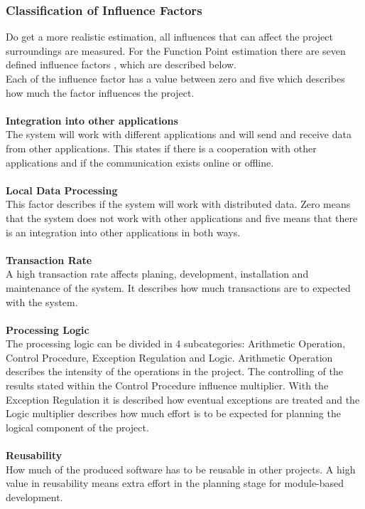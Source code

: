 \subsubsection{ Classification of Influence Factors}

Do get a more realistic estimation, all influences that can affect the project surroundings are measured. For the Function Point estimation there are seven defined influence factors \cite{Softwaremanagement}, which are described below.\\
Each of the influence factor has a value between zero and five which describes how much the factor influences the project.\\
\\
\textbf{Integration into other applications}\\
The system will work with different applications and will send and receive data from other applications. This states if there is a cooperation with other applications and if the communication exists online or offline. 
\\
\\
\textbf{Local Data Processing}\\
This factor describes if the system will work with distributed data. Zero means that the system does not work with other applications and five means that there is an integration into other applications in both ways.\\
\\
\textbf{Transaction Rate}\\
A high transaction rate affects planing, development, installation and maintenance of the system. It describes how much transactions are to expected with the system.\\
\\
\textbf{Processing Logic}\\
The processing logic can be divided in 4 subcategories: Arithmetic Operation, Control Procedure, Exception Regulation and Logic. Arithmetic Operation describes the intensity of the operations in the project. The controlling of the results stated within the Control Procedure influence multiplier. With the Exception Regulation it is described how eventual exceptions are treated and the Logic multiplier describes how much effort is to be expected for planning the logical component of the project.\\
\\
\textbf{Reusability}\\
How much of the produced software has to be reusable in other projects. A high value in reusability means extra effort in the planning stage for module-based development.\\
